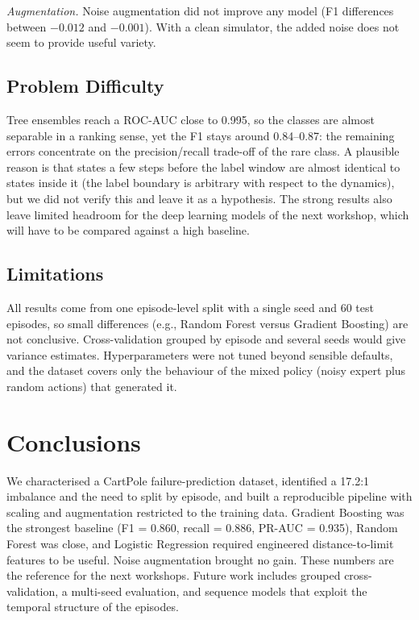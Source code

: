 \documentclass[conference]{IEEEtran}
\begin{document}
\emph{Augmentation.} Noise augmentation did not improve any model (F1 differences between
$-0.012$ and $-0.001$). With a clean simulator, the added noise does not seem to provide
useful variety.

\subsection{Problem Difficulty}
Tree ensembles reach a ROC-AUC close to 0.995, so the classes are almost separable in a
ranking sense, yet the F1 stays around 0.84--0.87: the remaining errors concentrate on the
precision/recall trade-off of the rare class. A plausible reason is that states a few steps
before the label window are almost identical to states inside it (the label boundary is
arbitrary with respect to the dynamics), but we did not verify this and leave it as a
hypothesis. The strong results also leave limited headroom for the deep learning models of
the next workshop, which will have to be compared against a high baseline.

\subsection{Limitations}
All results come from one episode-level split with a single seed and 60 test episodes, so
small differences (e.g., Random Forest versus Gradient Boosting) are not conclusive.
Cross-validation grouped by episode and several seeds would give variance estimates.
Hyperparameters were not tuned beyond sensible defaults, and the dataset covers only the
behaviour of the mixed policy (noisy expert plus random actions) that generated it.

\section{Conclusions}
We characterised a CartPole failure-prediction dataset, identified a 17.2:1 imbalance and
the need to split by episode, and built a reproducible pipeline with scaling and
augmentation restricted to the training data. Gradient Boosting was the strongest baseline
(F1 = 0.860, recall = 0.886, PR-AUC = 0.935), Random Forest was close, and Logistic
Regression required engineered distance-to-limit features to be useful. Noise augmentation
brought no gain. These numbers are the reference for the next workshops. Future work
includes grouped cross-validation, a multi-seed evaluation, and sequence models that
exploit the temporal structure of the episodes.
\end{document}
